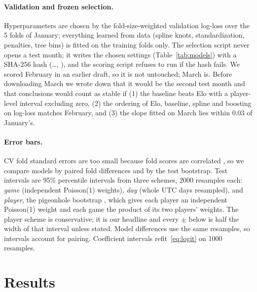 \documentclass{article}
\begin{document}
\paragraph{Validation and frozen selection.} Hyperparameters are chosen by the fold-size-weighted validation log-loss over the 5 folds of January; everything learned from data (spline knots, standardization, penalties, tree bins) is fitted on the training folds only. The selection script never opens a test month; it writes the chosen settings (Table~\ref{tab:models}) with a SHA-256 hash (\selectionHash\dots, \selectionTime), and the scoring script refuses to run if the hash fails. We scored February in an earlier draft, so it is not untouched; March is. Before downloading March we wrote down that it would be the second test month and that conclusions would count as stable if (1) the baseline beats Elo with a player-level interval excluding zero, (2) the ordering of Elo, baseline, spline and boosting on log-loss matches February, and (3) the slope fitted on March lies within 0.03 of January's.

\paragraph{Error bars.} CV fold standard errors are too small because fold scores are correlated \citep{bates2024}, so we compare models by paired fold differences and by the test bootstrap. Test intervals are 95\% percentile intervals from three schemes, 2000 resamples each: \emph{game} (independent Poisson(1) weights), \emph{day} (whole UTC days resampled), and \emph{player}, the pigeonhole bootstrap \citep{owen2007}, which gives each player an independent Poisson(1) weight and each game the product of its two players' weights. The player scheme is conservative; it is our headline and every $\pm$ below is half the width of that interval unless stated. Model differences use the same resamples, so intervals account for pairing. Coefficient intervals refit~\eqref{eq:logit} on 1000 resamples.

\section{Results}

\begin{table}[t]
  \centering
  \caption{Model comparison. CV is the fold-size-weighted log-loss over 5 day-blocked folds of January. Test columns are on February and March; $\pm$ is half the width of the 95\% player-level bootstrap interval (2000 resamples). $\Delta$ is the paired difference in log-loss in units of $10^{-4}$, so negative values are better than the reference. Tuned settings: baseline by time class; rating logistic $\lambda = \bestLam$; spline $K=\bestKnots$ knots, $\lambda = \splineLam$; boosting \boostTrees{} trees, \boostLeaves{} leaves, learning rate \boostLr.}
  \label{tab:models}
  \scriptsize
  \resizebox{\textwidth}{!}{}
\end{table}
\end{document}
